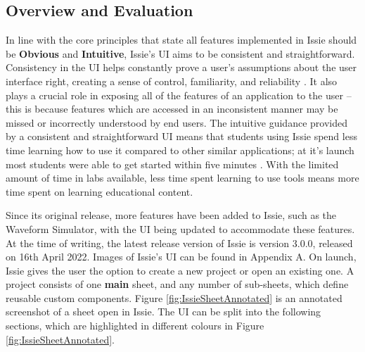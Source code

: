 \subsection{Overview and Evaluation}
In line with the core principles that state all features implemented in Issie should be \textbf{Obvious} and \textbf{Intuitive}, Issie's UI aims to be consistent and straightforward. Consistency in the UI helps constantly prove a user’s assumptions about the user interface right, creating a sense of control, familiarity, and reliability \cite{uiconsistency}. It also plays a crucial role in exposing all of the features of an application to the user -- this is because features which are accessed in an inconsistent manner may be missed or incorrectly understood by end users. The intuitive guidance provided by a consistent and straightforward UI means that students using Issie spend less time learning how to use it compared to other similar applications; at it's launch most students were able to get started within five minutes \cite{marco_diss}. With the limited amount of time in labs available, less time spent learning to use tools means more time spent on learning educational content.

Since its original release, more features have been added to Issie, such as the Waveform Simulator, with the UI being updated to accommodate these features. At the time of writing, the latest release version of Issie is version 3.0.0, released on 16th April 2022. Images of Issie's UI can be found in Appendix A. On launch, Issie gives the user the option to create a new project or open an existing one. A project consists of one \textbf{main} sheet, and any number of sub-sheets, which define reusable custom components. Figure \ref{fig:IssieSheetAnnotated} is an annotated screenshot of a sheet open in Issie. The UI can be split into the following sections, which are highlighted in different colours in Figure \ref{fig:IssieSheetAnnotated}.

